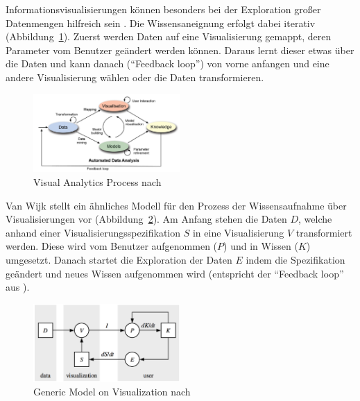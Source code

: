 \documentclass[
	headsepline,
	footsepline,
	fontsize=12pt,
	bibliography=totoc
]{scrbook}
\begin{document}
Informationsvisualisierungen können besonders bei der Exploration großer Datenmengen hilfreich sein \cite{Kohlhammer2011}. Die Wissensaneignung erfolgt dabei iterativ (Abbildung~\ref{figure:visual_analytics_process}). Zuerst werden Daten auf eine Visualisierung gemappt, deren Parameter vom Benutzer geändert werden können. Daraus lernt dieser etwas über die Daten und kann danach (\enquote{Feedback loop}) von vorne anfangen und eine andere Visualisierung wählen oder die Daten transformieren.

\begin{figure}[htbp]
   \centering
   \includegraphics[width=0.5\textwidth]{images/grundlagen-visual_analytics_process.png} 
   \caption{Visual Analytics Process nach \cite{Kohlhammer2011}}
   \label{figure:visual_analytics_process}
\end{figure}

Van Wijk \cite{vanWijk2005} stellt ein ähnliches Modell für den Prozess der Wissensaufnahme über Visualisierungen vor (Abbildung~\ref{figure:visualization_model}). Am Anfang stehen die Daten $D$, welche anhand einer Visualisierungsspezifikation $S$ in eine Visualisierung $V$ transformiert werden. Diese wird vom Benutzer aufgenommen ($P$) und in Wissen ($K$) umgesetzt. Danach startet die Exploration der Daten $E$ indem die Spezifikation geändert und neues Wissen aufgenommen wird (entspricht der \enquote{Feedback loop} aus \cite{Kohlhammer2011}).

\begin{figure}[htbp]
   \centering
   \includegraphics[width=0.5\textwidth]{images/grundlagen-visualization_model.png} 
   \caption{Generic Model on Visualization nach \cite{vanWijk2005}}
   \label{figure:visualization_model}
\end{figure}
\end{document}
